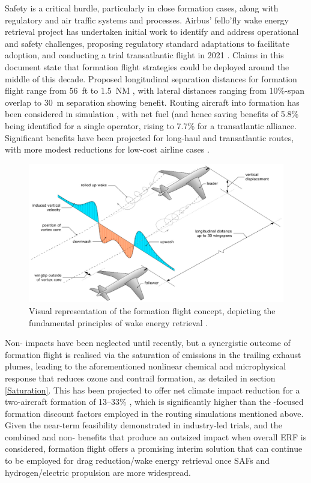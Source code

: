 Safety is a critical hurdle, particularly in close formation cases, along with regulatory and air traffic systems and processes. Airbus' fello’fly wake energy retrieval project has undertaken initial work to identify and address operational and safety challenges, proposing regulatory standard adaptations to facilitate adoption, and conducting a trial transatlantic flight in 2021 \cite{Airbus2021}. Claims in this document state that formation flight strategies could be deployed around the middle of this decade. Proposed longitudinal separation distances for formation flight range from 56~ft \cite{Hanson2002} to 1.5~NM \cite{Airbus2021}, with lateral distances ranging from 10\%-span overlap to 30~m separation showing benefit. Routing aircraft into formation has been considered in simulation \cite{Xu2014}, with net fuel (and hence  saving benefits of 5.8\% being identified for a single operator, rising to 7.7\% for a transatlantic alliance. Significant benefits have been projected for long-haul and transatlantic routes, with more modest reductions for low-cost airline cases \cite{Kent2020}. 


\begin{figure}[H]
  \centering
  \includegraphics[width=0.8\linewidth]{FF.png}
  \caption{Visual representation of the formation flight concept, depicting the fundamental principles of wake energy retrieval \cite{Marks2020}.}
  \label{Marks}
\end{figure}

Non- impacts have been neglected until recently, but a synergistic outcome of formation flight is realised via the saturation of emissions in the trailing exhaust plumes, leading to the aforementioned nonlinear chemical and microphysical response that reduces ozone and contrail formation, as detailed in section \ref{Saturation}. This has been projected to offer net climate impact reduction for a two-aircraft formation of 13--33\% \cite{Dahlmann2020}, which is significantly higher than the -focused formation discount factors employed in the routing simulations mentioned above. Given the near-term feasibility demonstrated in industry-led trials, and the combined  and non- benefits that produce an outsized impact when overall ERF is considered, formation flight offers a promising interim solution that can continue to be employed for drag reduction/wake energy retrieval once SAFs and hydrogen/electric propulsion are more widespread.

